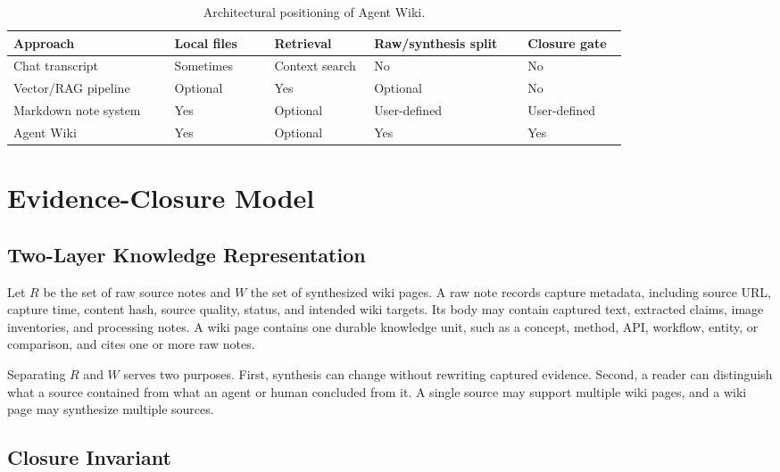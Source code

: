\documentclass[preprint,12pt,a4paper]{elsarticle}
\begin{document}
\begin{table}[H]
\centering
\small
\begin{tabular}{>{\raggedright\arraybackslash}p{0.21\linewidth}
  >{\centering\arraybackslash}p{0.13\linewidth}
  >{\centering\arraybackslash}p{0.13\linewidth}
  >{\centering\arraybackslash}p{0.20\linewidth}
  >{\centering\arraybackslash}p{0.13\linewidth}}
\toprule
Approach & Local files & Retrieval & Raw/synthesis split & Closure gate \\
\midrule
Chat transcript & Sometimes & Context search & No & No \\
Vector/RAG pipeline & Optional & Yes & Optional & No \\
Markdown note system & Yes & Optional & User-defined & User-defined \\
Agent Wiki & Yes & Optional & Yes & Yes \\
\bottomrule
\end{tabular}
\caption{Architectural positioning of Agent Wiki.}
\label{tab:positioning}
\end{table}

\section{Evidence-Closure Model}

\subsection{Two-Layer Knowledge Representation}

Let $R$ be the set of raw source notes and $W$ the set of synthesized wiki
pages. A raw note records capture metadata, including source URL, capture time,
content hash, source quality, status, and intended wiki targets. Its body may
contain captured text, extracted claims, image inventories, and processing
notes. A wiki page contains one durable knowledge unit, such as a concept,
method, API, workflow, entity, or comparison, and cites one or more raw notes.

Separating $R$ and $W$ serves two purposes. First, synthesis can change without
rewriting captured evidence. Second, a reader can distinguish what a source
contained from what an agent or human concluded from it. A single source may
support multiple wiki pages, and a wiki page may synthesize multiple sources.

\subsection{Closure Invariant}
\end{document}
